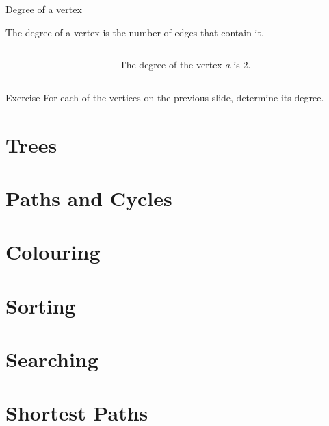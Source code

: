 \begin{frame}{Degree of a vertex}

	\begin{definition}
		The degree of a vertex is the number of edges that contain it.
	\end{definition}
	
    \begin{center}
      \begin{columns}
    \begin{column}{0.08\textwidth}
    
    \end{column}
    \begin{column}{0.5\textwidth}
        The degree of the vertex $a$ is 2.
    \end{column}
    \end{columns}
    \end{center}
    \begin{block}{Exercise}
      For each of the vertices on the previous slide, determine its degree.
    \end{block}

\end{frame}


\section{Trees}

\section{Paths and Cycles}

\section{Colouring}

\section{Sorting}

\section{Searching}

\section{Shortest Paths}

